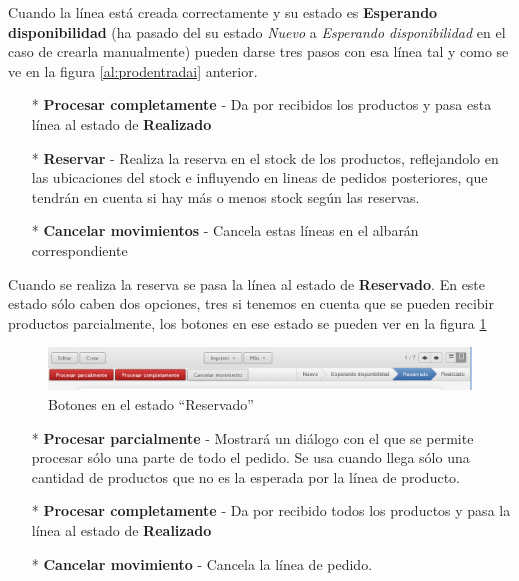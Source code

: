 \vspace{.5cm}
Cuando la línea está creada correctamente y su estado es \textbf{Esperando disponibilidad} (ha pasado del su estado \emph{Nuevo} a \emph{Esperando disponibilidad} en el caso de crearla manualmente) pueden darse tres pasos con esa línea tal y como se ve en la figura \ref{al:prodentradai} anterior.
\begin{itemize}
\item[*] \textbf{Procesar completamente} - Da por recibidos los productos y pasa esta línea al estado de \textbf{Realizado}
\item[*] \textbf{Reservar} - Realiza la reserva en el stock de los productos, reflejandolo en las ubicaciones del stock e influyendo en lineas de pedidos posteriores, que tendrán en cuenta si hay más o menos stock según las reservas.
\item[*] \textbf{Cancelar movimientos} - Cancela estas líneas en el albarán correspondiente
\end{itemize}

\vspace{.5cm}
Cuando se realiza la reserva se pasa la línea al estado de \textbf{Reservado}. En este estado sólo caben dos opciones, tres si tenemos en cuenta que se pueden recibir productos parcialmente, los botones en ese estado se pueden ver en la figura \ref{al:prodentradares}

\begin{figure}[H]
\includegraphics[width=\textwidth]{almacen/img/prod_salida_state.png}
\caption{Botones en el estado ``Reservado''}
\label{al:prodentradares}
\end{figure}

\begin{itemize}
\item[*] \textbf{Procesar parcialmente} - Mostrará un diálogo con el que se permite procesar sólo una parte de todo el pedido. Se usa cuando llega sólo una cantidad de productos que no es la esperada por la línea de producto.
\item[*] \textbf{Procesar completamente} - Da por recibido todos los productos y pasa la línea al estado de \textbf{Realizado}
\item[*] \textbf{Cancelar movimiento} - Cancela la línea de pedido.
\end{itemize}

